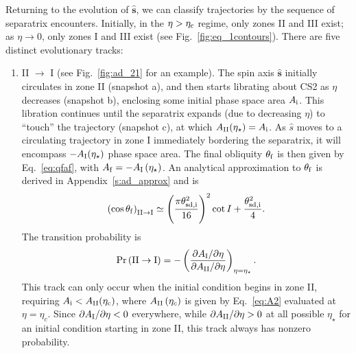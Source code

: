\documentclass[twocolumn,twocolappendix]{aastex63}
\newcommand*{\pdil}[2]{\partial#1 / \partial#2}
\newcommand*{\bsmb}[1]{\boldsymbol{\mathbf{#1}}}
\newcommand*{\uv}[1]{\hat{\bsmb{#1}}}
\newcommand*{\p}[1]{\left(#1\right)}
\begin{document}
Returning to the evolution of $\uv{s}$, we can classify trajectories by the
sequence of separatrix encounters. Initially, in the $\eta > \eta_{\rm c}$
regime, only zones II and III exist; as $\eta \to 0$, only zones I and III exist
(see Fig.~\ref{fig:eq_1contours}). There are five distinct evolutionary tracks:
\begin{enumerate}
    \item II $\to$ I (see Fig.~\ref{fig:ad_21} for an example). The spin axis
        $\uv{s}$ initially circulates in zone II (snapshot a), and then starts
        librating about CS2 as $\eta$ decreases (snapshot b), enclosing some
        initial phase space area $A_{\rm i}$. This libration continues until the
        separatrix expands (due to decreasing $\eta$) to ``touch'' the
        trajectory (snapshot c), at which $A_{\rm II}(\eta_\star) = A_{\rm i}$.
        As $\hat{s}$ moves to a circulating trajectory in zone I immediately
        bordering the separatrix, it will encompass $-A_{\rm I}(\eta_\star)$
        phase space area. The final obliquity $\theta_{\rm f}$ is then given by
        Eq.~\eqref{eq:qfaf}, with $A_{\rm f} = -A_{\rm I}\p{\eta_\star}$. An
        analytical approximation to $\theta_{\rm f}$ is derived in
        Appendix~\ref{s:ad_approx} and is
        \begin{equation}
            \p{\cos \theta_{\rm f}}_{\rm II \to I} \simeq
                \p{\frac{\pi \theta_{\rm sd, i}^2}{16}}^2 \cot I
                    + \frac{\theta_{\rm sd, i}^2}{4}.\label{eq:qf_21_approx}
        \end{equation}
        The transition probability is
        \begin{equation}
            \Pr\p{\mathrm{II} \to \mathrm{I}} = -\p{
                \frac{\pdil{A_{\rm I}}{\eta}}{\pdil{A_{\rm II}}{\eta}}}
                    _{\eta = \eta_{\star}}.
        \end{equation}
        This track can only occur when the initial condition begins in zone II,
        requiring $A_{\rm i} < A_{\rm II}(\eta_{\rm c})$, where $A_{\rm
        II}\p{\eta_c}$ is given by Eq.~\eqref{eq:A2} evaluated at $\eta =
        \eta_c$. Since $\pdil{A_{\rm I}}{\eta} < 0$ everywhere, while
        $\pdil{A_{\rm II}}{\eta} > 0$ at all possible $\eta_\star$ for an
        initial condition starting in zone II, this track always has nonzero
        probability.


\end{enumerate}
\end{document}
